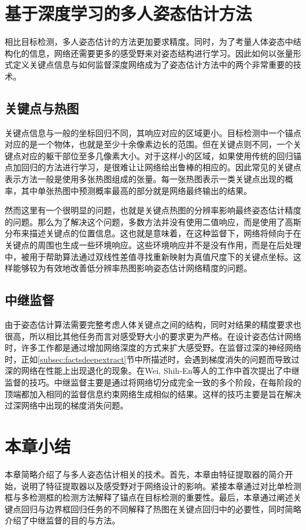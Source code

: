 \section{基于深度学习的多人姿态估计方法}
\label{sec:factspose}
相比目标检测，多人姿态估计的方法更加要求精度。同时，为了考量人体姿态中结构化的信息，网络还需要更多的感受野来对姿态结构进行学习。因此如何以张量形式定义关键点信息与如何监督深度网络成为了姿态估计方法中的两个非常重要的技术。

\subsection{关键点与热图}
\label{subsec:factsheatmaps}
关键点信息与一般的坐标回归不同，其响应对应的区域更小。目标检测中一个锚点对应的是一个物体，也就是至少十余像素边长的范围。但在关键点则不同，一个关键点对应的躯干部位至多几像素大小。对于这样小的区域，如果使用传统的回归锚点加回归的方法进行学习，是很难让让网络给出鲁棒的相应的。因此常见的关键点表示方法一般是使用多张热图组成的张量。每一张热图表示一类关键点出现的概率，其中单张热图中预测概率最高的部分就是网络最终输出的结果。

然而这里有一个很明显的问题，也就是关键点热图的分辨率影响最终姿态估计精度的问题。那么为了解决这个问题，多数方法并没有使用二值响应，而是使用了高斯分布来描述关键点的位置信息。这也就是意味着，在这种监督下，网络将倾向于在关键点的周围也生成一些环境响应。这些环境响应并不是没有作用，而是在后处理中，被用于帮助算法通过双线性差值寻找重新映射为真值尺度下的关键点坐标。这样能够较为有效地改善低分辨率热图影响姿态估计网络精度的问题。

\subsection{中继监督}
\label{subsec:factsintersupervision}
由于姿态估计算法需要完整考虑人体关键点之间的结构，同时对结果的精度要求也很高，所以相比其他任务而言对感受野大小的要求更为严格。在设计姿态估计网络时，许多工作都是通过增加网络深度的方式来扩大感受野。在监督过深的神经网络时，正如\ref{subsec:factsdeepextract}节中所描述时，会遇到梯度消失的问题而导致过深的网络在性能上出现退化的现象。在Wei, Shih-En等人的工作中\cite{wei2016convolutional}首次提出了中继监督的技巧。中继监督主要是通过将网络切分成完全一致的多个阶段，在每阶段的顶端都加入相同的监督信息约束网络生成相似的结果。这样的技巧主要是旨在解决过深网络中出现的梯度消失问题。

\section{本章小结}
本章简略介绍了与多人姿态估计相关的技术。首先，本章由特征提取器的简介开始，说明了特征提取器以及感受野对于网络设计的影响。紧接本章通过对比单检测框与多检测框的检测方法解释了锚点在目标检测的重要性。最后，本章通过阐述关键点回归与边界框回归任务的不同解释了热图在关键点回归中的必要性，同时简略介绍了中继监督的目的与方法。
